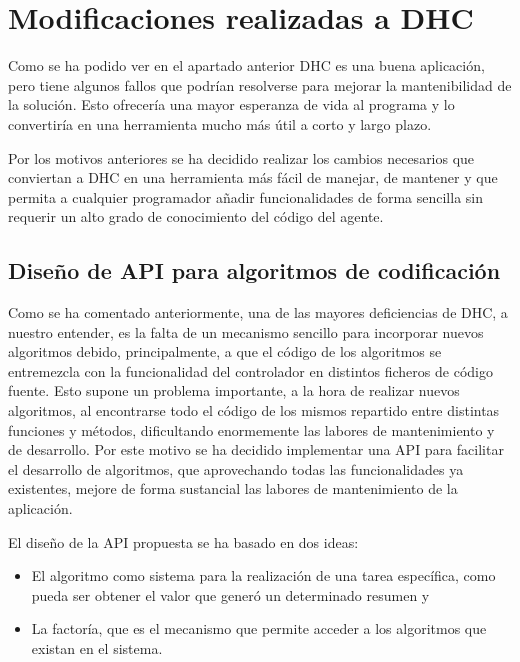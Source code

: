 \section{Modificaciones realizadas a DHC}

Como se ha podido ver en el apartado anterior DHC es una buena aplicación, pero tiene algunos fallos que podrían resolverse para mejorar la mantenibilidad de la solución. Esto ofrecería una mayor esperanza de vida al programa y lo convertiría en una herramienta mucho más útil a corto y largo plazo.

Por los motivos anteriores se ha decidido realizar los cambios necesarios que conviertan a DHC en una herramienta más fácil de manejar, de mantener y que permita a cualquier programador añadir funcionalidades de forma sencilla sin requerir un alto grado de conocimiento del código del agente.

\subsection{Diseño de API para algoritmos de codificación}\label{sec:api_alg}

Como se ha comentado anteriormente, una de las mayores deficiencias de DHC, a nuestro entender, es la falta de un mecanismo sencillo para incorporar nuevos algoritmos debido, principalmente, a que el código de los algoritmos se entremezcla con la funcionalidad del controlador en distintos ficheros de código fuente. Esto supone un problema importante, a la hora de realizar nuevos algoritmos, al encontrarse todo el código de los mismos repartido entre distintas funciones y métodos, dificultando enormemente las labores de mantenimiento y de desarrollo. Por este motivo se ha decidido implementar una API para facilitar el desarrollo de algoritmos, que aprovechando todas las funcionalidades ya existentes, mejore de forma sustancial las labores de mantenimiento de la aplicación.

El diseño de la API propuesta se ha basado en dos ideas:
\begin{itemize}
	\item El algoritmo como sistema para la realización de una tarea específica, como pueda ser obtener el valor que generó un determinado resumen y
	
	\item La factoría, que es el mecanismo que permite acceder a los algoritmos que existan en el sistema.
\end{itemize}

